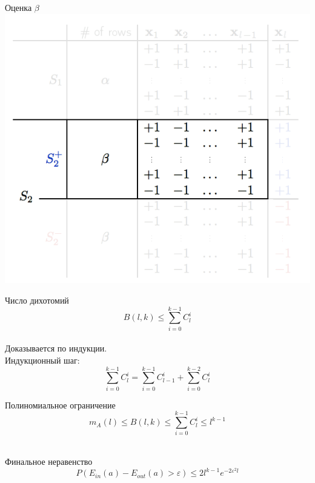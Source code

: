 \documentclass[10pt]{beamer}
\begin{document}
\begin{frame}{Оценка $\beta$}  
  \centering
  \includegraphics[width=\textwidth, height=0.8 \textheight, keepaspectratio]{images/breakpoint2}
\end{frame}

\begin{frame}{Число дихотомий}  
  $$B(l, k) \leq \sum\limits_{i=0}^{k-1} C_l^i$$\\
  Доказывается по индукции.\\
  Индукционный шаг:
  $$\sum\limits_{i=0}^{k-1} C_l^i = \sum\limits_{i=0}^{k-1} C_{l-1}^i + \sum\limits_{i=0}^{k-2} C_l^i$$
\end{frame}

\begin{frame}{Полиномиальное ограничение}  
  $$m_{A}(l) \leq B(l, k) \leq \sum\limits_{i=0}^{k-1} C_l^i \leq l^{k-1}$$\\
\end{frame}

\begin{frame}{Финальное неравенство}  
  $$P(E_{in}(a) - E_{out}(a) > \varepsilon) \leq 2 l^{k-1} e^{-2 \varepsilon^2 l}$$\\
\end{frame}
\end{document}
